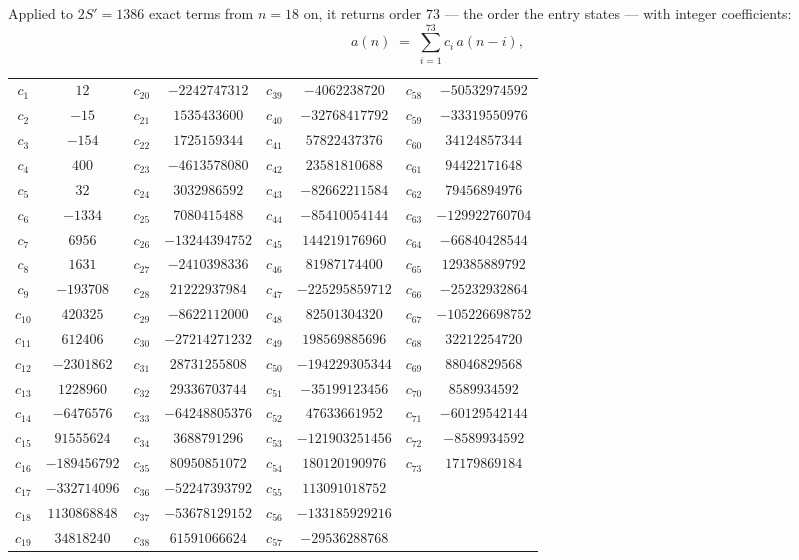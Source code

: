 \documentclass[11pt,a4paper]{article}
\theoremstyle{plain}
\theoremstyle{definition}
\begin{document}
Applied to $2S'=1386$ exact terms from $n=18$ on, it returns order $73$ --- the
order the entry states --- with integer coefficients:
\[
a(n)\;=\;\sum_{i=1}^{73}c_i\,a(n-i),
\]
\begin{center}\small
\begin{tabular}{cccccccc}
$c_{1}$ & $12$ & $c_{20}$ & $-2242747312$ & $c_{39}$ & $-4062238720$ & $c_{58}$ & $-50532974592$ \\
$c_{2}$ & $-15$ & $c_{21}$ & $1535433600$ & $c_{40}$ & $-32768417792$ & $c_{59}$ & $-33319550976$ \\
$c_{3}$ & $-154$ & $c_{22}$ & $1725159344$ & $c_{41}$ & $57822437376$ & $c_{60}$ & $34124857344$ \\
$c_{4}$ & $400$ & $c_{23}$ & $-4613578080$ & $c_{42}$ & $23581810688$ & $c_{61}$ & $94422171648$ \\
$c_{5}$ & $32$ & $c_{24}$ & $3032986592$ & $c_{43}$ & $-82662211584$ & $c_{62}$ & $79456894976$ \\
$c_{6}$ & $-1334$ & $c_{25}$ & $7080415488$ & $c_{44}$ & $-85410054144$ & $c_{63}$ & $-129922760704$ \\
$c_{7}$ & $6956$ & $c_{26}$ & $-13244394752$ & $c_{45}$ & $144219176960$ & $c_{64}$ & $-66840428544$ \\
$c_{8}$ & $1631$ & $c_{27}$ & $-2410398336$ & $c_{46}$ & $81987174400$ & $c_{65}$ & $129385889792$ \\
$c_{9}$ & $-193708$ & $c_{28}$ & $21222937984$ & $c_{47}$ & $-225295859712$ & $c_{66}$ & $-25232932864$ \\
$c_{10}$ & $420325$ & $c_{29}$ & $-8622112000$ & $c_{48}$ & $82501304320$ & $c_{67}$ & $-105226698752$ \\
$c_{11}$ & $612406$ & $c_{30}$ & $-27214271232$ & $c_{49}$ & $198569885696$ & $c_{68}$ & $32212254720$ \\
$c_{12}$ & $-2301862$ & $c_{31}$ & $28731255808$ & $c_{50}$ & $-194229305344$ & $c_{69}$ & $88046829568$ \\
$c_{13}$ & $1228960$ & $c_{32}$ & $29336703744$ & $c_{51}$ & $-35199123456$ & $c_{70}$ & $8589934592$ \\
$c_{14}$ & $-6476576$ & $c_{33}$ & $-64248805376$ & $c_{52}$ & $47633661952$ & $c_{71}$ & $-60129542144$ \\
$c_{15}$ & $91555624$ & $c_{34}$ & $3688791296$ & $c_{53}$ & $-121903251456$ & $c_{72}$ & $-8589934592$ \\
$c_{16}$ & $-189456792$ & $c_{35}$ & $80950851072$ & $c_{54}$ & $180120190976$ & $c_{73}$ & $17179869184$ \\
$c_{17}$ & $-332714096$ & $c_{36}$ & $-52247393792$ & $c_{55}$ & $113091018752$ &  &  \\
$c_{18}$ & $1130868848$ & $c_{37}$ & $-53678129152$ & $c_{56}$ & $-133185929216$ &  &  \\
$c_{19}$ & $34818240$ & $c_{38}$ & $61591066624$ & $c_{57}$ & $-29536288768$ &  &  \\
\end{tabular}
\end{center}
\end{document}
